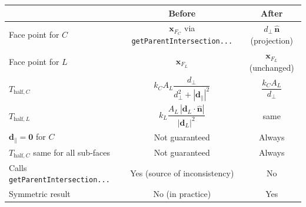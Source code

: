 \documentclass[11pt,a4paper]{article}
\begin{document}
\begin{center}
\renewcommand{\arraystretch}{1.4}
\begin{tabular}{lcc}
\toprule
 & \textbf{Before} & \textbf{After} \\
\midrule
Face point for $C$
  & $\mathbf{x}_{F_C}$ via \texttt{getParentIntersection...}
  & $d_\perp\,\hat{\mathbf{n}}$ (projection) \\[4pt]
Face point for $L$
  & $\mathbf{x}_{F_L}$
  & $\mathbf{x}_{F_L}$ (unchanged) \\[4pt]
$T_{\mathrm{half},C}^{\phantom{X}}$
  & $k_C A_L \dfrac{d_\perp}{d_\perp^2+|\mathbf{d}_\parallel|^2}$
  & $\dfrac{k_C A_L}{d_\perp}$ \\[10pt]
$T_{\mathrm{half},L}^{\phantom{X}}$
  & $k_L \dfrac{A_L\,|{\mathbf{d}_L\cdot\hat{\mathbf{n}}}|}{|\mathbf{d}_L|^2}$
  & same \\[8pt]
$\mathbf{d}_\parallel = \mathbf{0}$ for $C$
  & Not guaranteed
  & Always \\[4pt]
$T_{\mathrm{half},C}$ same for all sub-faces
  & Not guaranteed
  & Always \\[4pt]
Calls \texttt{getParentIntersection...}
  & Yes (source of inconsistency)
  & No \\[4pt]
Symmetric result
  & No (in practice)
  & Yes \\
\bottomrule
\end{tabular}
\end{center}
\end{document}
